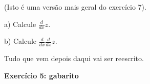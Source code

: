 \documentclass[oneside,12pt]{article}
\begin{document}
(Isto é uma versão mais geral do exercício 7).

\ssk

a) Calcule $\frac{d}{dx}z$.

\ssk

b) Calcule $\frac{d}{dx}\frac{d}{dx}z$.




\newpage






Tudo que vem depois daqui vai ser reescrito.




\newpage

%
%

{\bf Exercício 5: gabarito}

\end{document}
